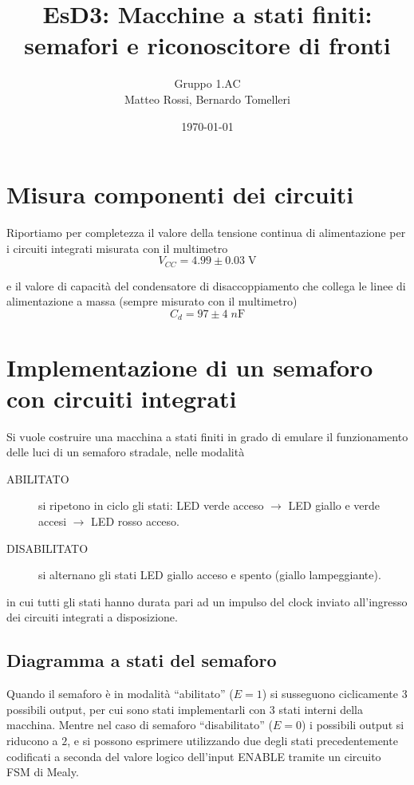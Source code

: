 \documentclass[10pt, a4paper, italian]{article}
\author{Gruppo 1.AC \\ Matteo Rossi, Bernardo Tomelleri}
\title{EsD3: Macchine a stati finiti: semafori e riconoscitore di fronti}
\begin{document}
\date{\today}
\maketitle

\section{Misura componenti dei circuiti}
Riportiamo per completezza il valore della tensione continua di
alimentazione per i circuiti integrati misurata con il multimetro
\[
V_{CC} = 4.99 \pm 0.03 \; \si{\V}
\]

e il valore di capacità del condensatore di disaccoppiamento che collega le
linee di alimentazione a massa (sempre misurato con il multimetro)
\[
C_d = 97 \pm 4 \; \si{n\F}
\]

\section{Implementazione di un semaforo con circuiti integrati}\label{sec: IC}
Si vuole costruire una macchina a stati finiti in grado di emulare il
funzionamento delle luci di un semaforo stradale, nelle modalità
\begin{description}
\item[ABILITATO] si ripetono in ciclo gli stati: LED verde acceso $\to$
LED giallo e verde accesi $\to$ LED rosso acceso.
\item[DISABILITATO] si alternano gli stati LED giallo acceso e spento
(giallo lampeggiante).
\end{description}
in cui tutti gli stati hanno durata pari ad un impulso del clock inviato
all'ingresso dei circuiti integrati a disposizione.

\subsection{Diagramma a stati del semaforo}
Quando il semaforo è in modalità ``abilitato'' ($E=1$) si susseguono
ciclicamente 3 possibili output, per cui sono stati implementarli con $3$ stati
interni della macchina. Mentre nel caso di semaforo ``disabilitato'' ($E=0$) i
possibili output si riducono a $2$, e si possono esprimere utilizzando due
degli stati precedentemente codificati a seconda del valore logico dell'input
ENABLE tramite un circuito FSM di Mealy.
\end{document}

